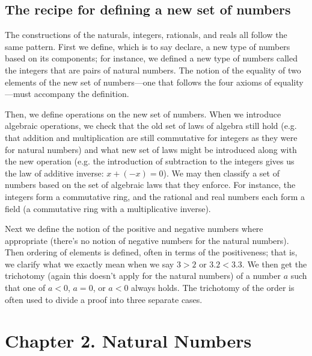 \documentclass{article}
\begin{document}
\subsection*{The recipe for defining a new set of numbers}
The constructions of the naturals, integers, rationals, and reals all follow the same pattern. First we define, which is to say declare, a new type of numbers based on its components; for instance, we defined a new type of numbers called the integers that are pairs of natural numbers. The notion of the equality of two elements of the new set of numbers---one that follows the four axioms of equality---must accompany the definition.

Then, we define operations on the new set of numbers. When we introduce algebraic operations, we check that the old set of laws of algebra still hold (e.g. that addition and multiplication are still commutative for integers as they were for natural numbers) and what new set of laws might be introduced along with the new operation (e.g. the introduction of subtraction to the integers gives us the law of additive inverse: $x + (-x) = 0$). We may then classify a set of numbers based on the set of algebraic laws that they enforce. For instance, the integers form a commutative ring, and the rational and real numbers each form a field (a commutative ring with a multiplicative inverse).


Next we define the notion of the positive and negative numbers where appropriate (there's no notion of negative numbers for the natural numbers). Then ordering of elements is defined, often in terms of the positiveness; that is, we clarify what we exactly mean when we say $3 > 2$ or $3.2 < 3.3$. We then get the trichotomy (again this doesn't apply for the natural numbers) of a number $a$ such that one of $a < 0$, $a = 0$, or $a < 0$ always holds. The trichotomy of the order is often used to divide a proof into three separate cases.

\section*{Chapter 2. Natural Numbers}
\end{document}
